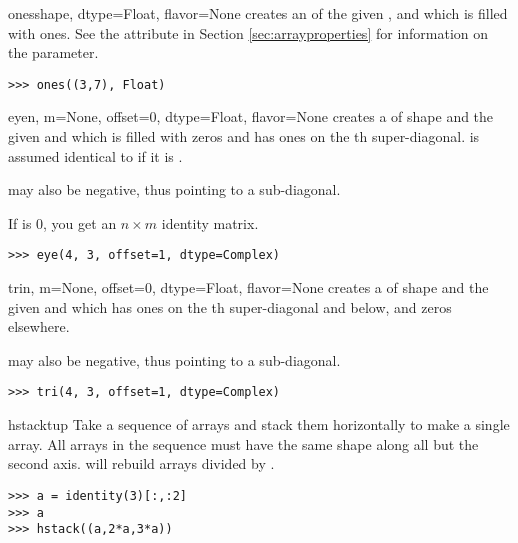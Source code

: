 \begin{funcdesc}{ones}{shape, dtype=Float, flavor=None}
   creates an  of the given ,
   and  which is filled with ones. See the
   attribute in Section \ref{sec:arrayproperties} for
  information on the  parameter.
\begin{verbatim}
>>> ones((3,7), Float)
\end{verbatim}
\end{funcdesc}

\begin{funcdesc}{eye}{n, m=None, offset=0, dtype=Float, flavor=None}
   creates a  of shape  and
  the given  and  which is filled with
  zeros and has ones on the th super-diagonal. 
   is assumed identical to  if it is .

   may also be negative, thus pointing to a sub-diagonal.

  If  is 0, you get an $n\times m$ identity matrix.

\begin{verbatim}
>>> eye(4, 3, offset=1, dtype=Complex)
\end{verbatim}
\end{funcdesc}

\begin{funcdesc}{tri}{n, m=None, offset=0, dtype=Float, flavor=None}
   creates a  of shape  and
  the given  and  which has ones on the 
  th super-diagonal and below, and zeros elsewhere.

   may also be negative, thus pointing to a sub-diagonal.

\begin{verbatim}
>>> tri(4, 3, offset=1, dtype=Complex)
\end{verbatim}
\end{funcdesc}

\begin{funcdesc}{hstack}{tup}
  Take a sequence of arrays and stack them horizontally to make a single array.
  All arrays in the sequence must have the same shape along all but the second
  axis.  will rebuild arrays divided by .
  
\begin{verbatim}
>>> a = identity(3)[:,:2]
>>> a
>>> hstack((a,2*a,3*a))
\end{verbatim}
\end{funcdesc}

